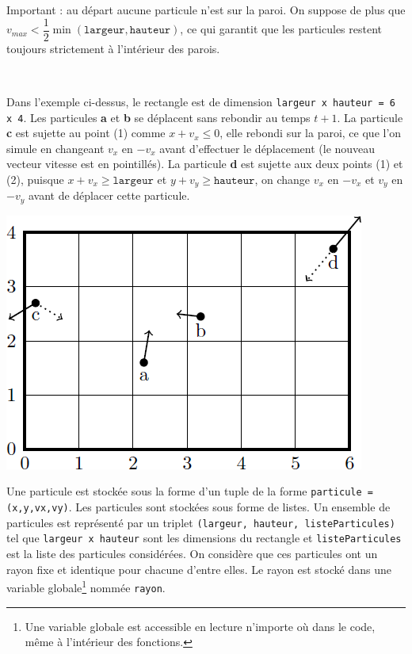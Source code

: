 \documentclass[10pt,fleqn]{article} %
\begin{document}
\begin{rem}
Important : au départ aucune particule n'est sur la paroi. On suppose de plus que $v_{max}<\dfrac{1}{2}\min \left(\texttt{largeur},\texttt{hauteur}\right)$, ce qui garantit que les particules restent toujours strictement à l'intérieur des parois. 
\end{rem}

\begin{exemple}~\\

\begin{minipage}[c]{.6\linewidth}
Dans l'exemple ci-dessus, le rectangle est de dimension \texttt{largeur x hauteur = 6 x 4}. Les particules \textbf{a} et \textbf{b} se déplacent sans rebondir au temps $t+1$. La particule \textbf{c} est sujette au point (1) comme $x+v_x\leq 0$, elle rebondi sur la paroi, ce que l'on simule en changeant $v_x$ en $-v_x$ avant d'effectuer le déplacement (le nouveau vecteur vitesse est en pointillés). La particule \textbf{d} est sujette aux deux points (1) et (2), puisque $x+v_x \geq \texttt{largeur}$ et  $y+v_y \geq \texttt{hauteur}$, on change $v_x$ en $-v_x$ et  $v_y$ en $-v_y$ avant de déplacer cette particule. 
\end{minipage}
\begin{minipage}[c]{.35\linewidth}
\begin{center}
\includegraphics[width=.9\linewidth]{images/fig_01}
\end{center}
\end{minipage}
\end{exemple}

Une particule est stockée sous la forme d'un tuple de la forme \texttt{particule = (x,y,vx,vy)}.
Les particules sont stockées sous forme de listes. Un ensemble de particules est représenté par un triplet \texttt{(largeur, hauteur, listeParticules)} tel que \texttt{largeur x hauteur} sont les dimensions du rectangle et \texttt{listeParticules} est la liste des particules considérées. On considère que ces particules ont un rayon fixe et identique pour chacune d'entre elles. Le rayon est stocké dans une variable globale\footnote{Une variable globale est accessible en lecture n'importe où dans le code, même
à l'intérieur des fonctions.} nommée \texttt{rayon}.
\end{document}
